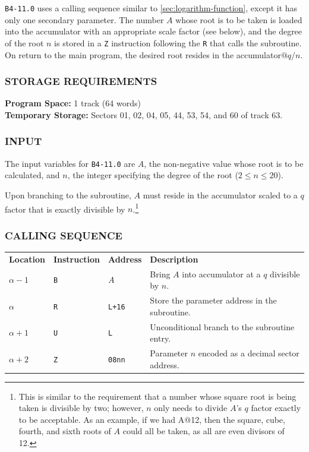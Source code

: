 \documentclass{article}
\begin{document}
\noindent
\texttt{B4-11.0} uses a calling sequence similar to \ref{sec:logarithm-function}, except it has only one secondary parameter. The number $A$ whose root is to be taken is loaded into the accumulator with an appropriate scale factor (see below), and the degree of the root $n$ is stored in a \texttt{Z} instruction following the \texttt{R} that calls the subroutine. On return to the main program, the desired root resides in the accumulator$@q/n$.

\subsubsection*{STORAGE REQUIREMENTS}
\noindent
\textbf{Program Space:} 1 track (64 words) \\
\textbf{Temporary Storage:} Sectors 01, 02, 04, 05, 44, 53, 54, and 60 of track 63.

\subsubsection*{INPUT}
\noindent
The input variables for \texttt{B4-11.0} are $A$, the non-negative value whose root is to be calculated, and $n$, the integer specifying the degree of the root ($2 \le n \le 20$). 

\noindent
Upon branching to the subroutine, $A$ must reside in the accumulator scaled to a $q$ factor that is exactly divisible by $n$.\footnote{This is similar to the requirement that a number whose square root is being taken is divisible by two; however, $n$ only needs to divide $A$'s $q$ factor exactly to be acceptable. As an example, if we had A@12, then the square, cube, fourth, and sixth roots of $A$ could all be taken, as all are even divisors of 12.}

\subsubsection*{CALLING SEQUENCE}
\noindent
\begin{tabular}{llll}
\textbf{Location} & \textbf{Instruction} & \textbf{Address} & \textbf{Description} \\
$\alpha - 1$      & \texttt{B}            & $A$              & Bring $A$ into accumulator at a $q$ divisible by $n$. \\
$\alpha$          & \texttt{R}            & \texttt{L+16}    & Store the parameter address in the subroutine. \\
$\alpha + 1$      & \texttt{U}            & \texttt{L}       & Unconditional branch to the subroutine entry. \\
$\alpha + 2$      & \texttt{Z}            & \texttt{08nn}    & Parameter $n$ encoded as a decimal sector address. \\
\end{tabular}
\end{document}
